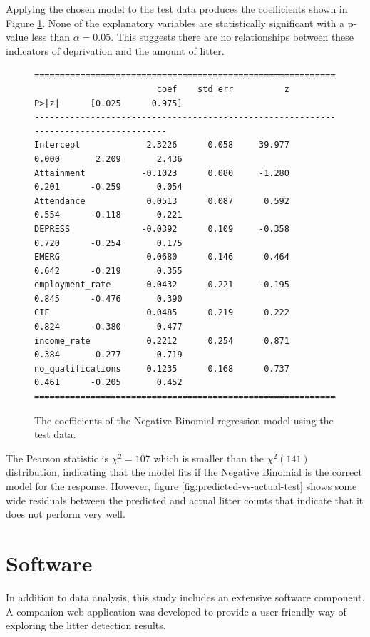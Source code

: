 \documentclass{thesis}
\begin{document}
Applying the chosen model to the test data produces the coefficients shown in Figure \ref{fig:nb-coeff-test}. None of the explanatory variables are statistically significant with a p-value less than $\alpha = 0.05$. This suggests there are no relationships between these indicators of deprivation and the amount of litter.

\begin{figure}[h!]
    \centering
\footnotesize
\begin{verbatim}
=====================================================================================
                        coef    std err          z      P>|z|      [0.025      0.975]
-------------------------------------------------------------------------------------
Intercept             2.3226      0.058     39.977      0.000       2.209       2.436
Attainment           -0.1023      0.080     -1.280      0.201      -0.259       0.054
Attendance            0.0513      0.087      0.592      0.554      -0.118       0.221
DEPRESS              -0.0392      0.109     -0.358      0.720      -0.254       0.175
EMERG                 0.0680      0.146      0.464      0.642      -0.219       0.355
employment_rate      -0.0432      0.221     -0.195      0.845      -0.476       0.390
CIF                   0.0485      0.219      0.222      0.824      -0.380       0.477
income_rate           0.2212      0.254      0.871      0.384      -0.277       0.719
no_qualifications     0.1235      0.168      0.737      0.461      -0.205       0.452
=====================================================================================
\end{verbatim}
\normalsize
    \caption{The coefficients of the Negative Binomial regression model using the test data.}
    \label{fig:nb-coeff-test}
\end{figure}

The Pearson statistic is $\chi^2 = 107$ which is smaller than the $\chi^2(141)$ distribution, indicating that the model fits if the Negative Binomial is the correct model for the response. However, figure \ref{fig:predicted-vs-actual-test} shows some wide residuals between the predicted and actual litter counts that indicate that it does not perform very well.

\chapter{Software}

In addition to data analysis, this study includes an extensive software component. A companion web application was developed to provide a user friendly way of exploring the litter detection results.
\end{document}
